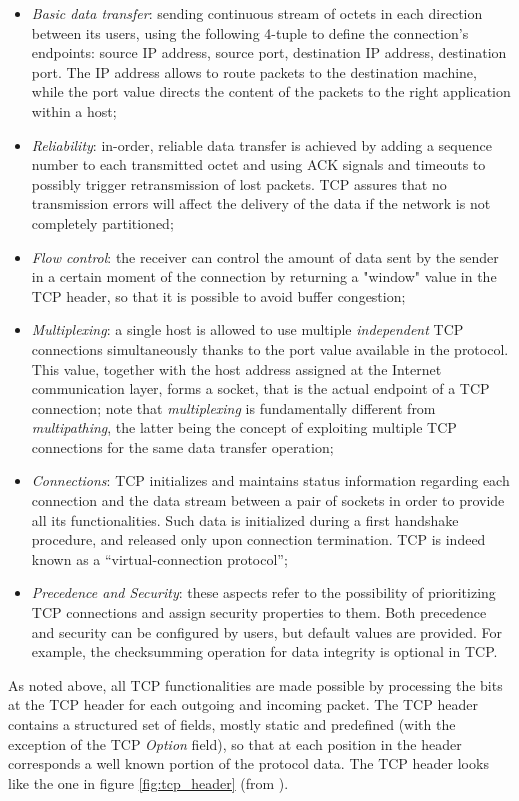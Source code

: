 \begin{itemize}
  \item \textit{Basic data transfer}: sending continuous stream of octets in each direction between its users, using the following 4-tuple to define the connection's endpoints: source IP address, source port, destination IP address, destination port. The IP address allows to route packets to the destination machine, while the port value directs the content of the packets to the right application within a host;
  \item \textit{Reliability}: in-order, reliable data transfer is achieved by adding a sequence number to each transmitted octet and using ACK signals and timeouts to possibly trigger retransmission of lost packets. TCP assures that no transmission errors will affect the delivery of the data if the network is not completely partitioned;
  \item \textit{Flow control}: the receiver can control the amount of data sent by the sender in a certain moment of the connection by returning a "window" value in the TCP header, so that it is possible to avoid buffer congestion;
  \item \textit{Multiplexing}: a single host is allowed to use multiple \textit{independent} TCP connections simultaneously thanks to the port value available in the protocol. This value, together with the host address assigned at the Internet communication layer, forms a socket, that is the actual endpoint of a TCP connection; note that \textit{multiplexing} is fundamentally different from \textit{multipathing}, the latter being the concept of exploiting multiple TCP connections for the same data transfer operation;
  \item \textit{Connections}: TCP initializes and maintains status information regarding each connection and the data stream between a pair of sockets in order to provide all its functionalities. Such data is initialized during a first handshake procedure, and released only upon connection termination. TCP is indeed known as a ``virtual-connection protocol'';
  \item \textit{Precedence and Security}: these aspects refer to the possibility of prioritizing TCP connections and assign security properties to them. Both precedence and security can be configured by users, but default values are provided. For example, the checksumming operation for data integrity is optional in TCP.
\end{itemize}

As noted above, all TCP functionalities are made possible by processing the bits at the TCP header for each outgoing and incoming packet. The TCP header contains a structured set of fields, mostly static and predefined (with the exception of the TCP \textit{Option} field), so that at each position in the header corresponds a well known portion of the protocol data. The TCP header looks like the one in figure \ref{fig:tcp_header} (from ).

